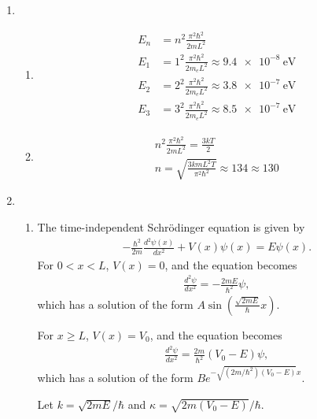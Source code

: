 \documentclass[a4paper,12pt]{article}
\begin{document}
\begin{enumerate}
    \item
        \begin{enumerate}
            \item
                \begin{align*}
                    E_n &= n^2 \frac{\pi^2 \hbar^2}{2mL^2} \\
                    E_1 &= 1^2 \frac{\pi^2 \hbar^2}{2 m_e L^2} \approx \SI{9.4e-8}{\eV} \\
                    E_2 &= 2^2 \frac{\pi^2 \hbar^2}{2 m_e L^2} \approx \SI{3.8e-7}{\eV} \\
                    E_3 &= 3^2 \frac{\pi^2 \hbar^2}{2 m_e L^2} \approx \SI{8.5e-7}{\eV}
                \end{align*}

            \item
                \begin{gather}
                    n^2 \frac{\pi^2 \hbar^2}{2mL^2} = \frac{3kT}{2} \\
                    n = \sqrt{\frac{3kmL^2T}{\pi^2 \hbar^2}} \approx 134 \approx 130
                \end{gather}
        \end{enumerate}

    \item
        \begin{enumerate}
            \item
                The time-independent Schr\"{o}dinger equation is given by
                \begin{align*}
                    -\frac{\hbar^2}{2m} \frac{d^2 \psi(x)}{dx^2} + V(x) \psi(x) = E \psi(x).
                \end{align*}
                For $0 < x < L$, $V(x) = 0$, and the equation becomes
                \begin{align*}
                    \frac{d^2 \psi}{dx^2} = -\frac{2mE}{\hbar^2} \psi,
                \end{align*}
                which has a solution of the form $A\sin\left( \frac{\sqrt{2mE}}{\hbar} x \right)$. \par
                For $x \geq L$, $V(x) = V_0$, and the equation becomes
                \begin{align*}
                    \frac{d^2 \psi}{dx^2} = \frac{2m}{\hbar^2} (V_0 - E) \psi,
                \end{align*}
                which has a solution of the form $Be^{-\sqrt{(2m/\hbar^2)(V_0 - E)} x}$. \par
                Let $k = \sqrt{2mE} / \hbar$ and $\kappa = \sqrt{2m(V_0 - E)} / \hbar$.


\end{enumerate}
\end{enumerate}
\end{document}

